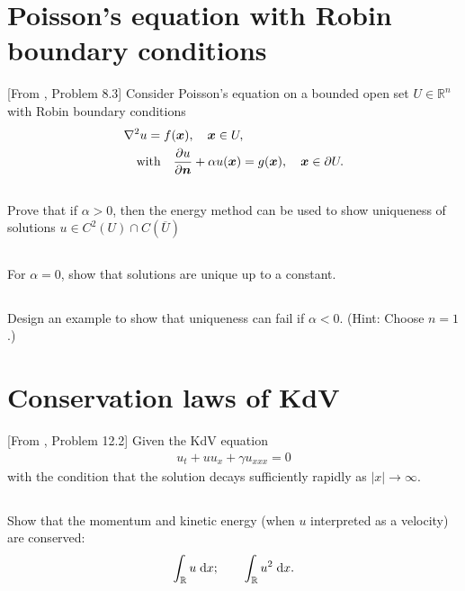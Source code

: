 \documentclass[11pt,letterpaper]{article}
\begin{document}
\section{Poisson’s equation with Robin boundary conditions}
[From \cite{ShearerLevy_15}, Problem 8.3]
Consider Poisson’s equation on a bounded open set $U \in\mathbb{R}^n$ with Robin boundary conditions
\begin{align}
    &\nabla^2 u = f(\boldsymbol{x}),\quad\boldsymbol{x}\in U,\\
    &\quad \mbox{with} \quad \frac{\partial u}{\partial\boldsymbol{n}}+\alpha u(\boldsymbol{x}) = g(\boldsymbol{x}),\quad\boldsymbol{x}\in\partial U.
\end{align}

\subsection{}
Prove that if $\alpha > 0$, then the energy method can be used to show
uniqueness of solutions $u\in C^2(U)\cap C(\overline{U})$

\subsection{}
For $\alpha = 0$, show that solutions are unique up to a constant.

\subsection{}
Design an example to show that uniqueness can fail if $\alpha < 0$. (Hint: Choose $n = 1$.)

\section{Conservation laws of KdV}
[From \cite{ShearerLevy_15}, Problem 12.2] Given the KdV equation
\begin{align}
    u_t+uu_x+\gamma u_{xxx} = 0
\end{align}
with the condition that the solution decays sufficiently rapidly as $|x|\to\infty$.

\subsection{}
Show that the momentum and kinetic energy (when $u$ interpreted as a velocity) are conserved:
\begin{align}
    \int_\mathbb{R} u\;\mathrm{d} x; \qquad \int_\mathbb{R} u^2\;\mathrm{d} x.
\end{align}
\end{document}
